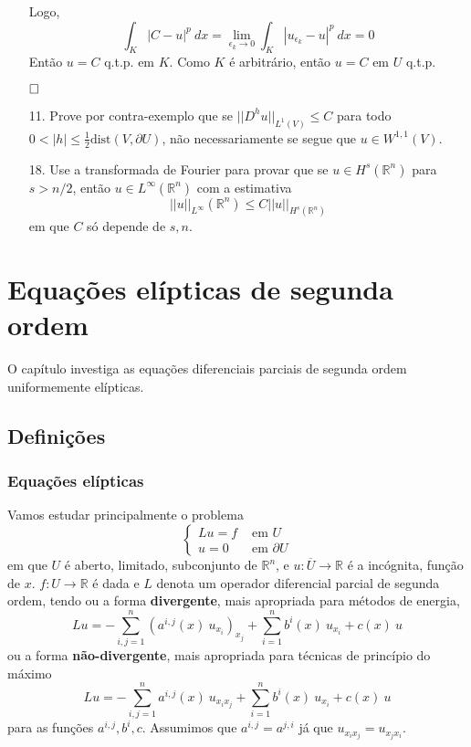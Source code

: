 \documentclass[a4paper, 11pt]{book}
\newcommand{\qed}{$\hfill\square$}
\newcommand{\R}{\mathbb{R}}
\newcommand{\Rn}{{\mathbb{R}^n}}
\newcommand{\rn}{{\mathbb{R}^n}}
\newcommand{\pu}{\partial U}
\begin{document}
\begin{enumerate}
	Logo, \[
	\int_K |C - u|^p \ dx = \lim_{\epsilon_k \rightarrow 0} \int_K | u_{\epsilon_k} - u|^p \ dx = 0	
	\]
	Então $u = C$ q.t.p. em $K$. Como $K$ é arbitrário, então $u=C$ em $U$ q.t.p.
	
	\qed


	\item[11.] Prove por contra-exemplo que se $||D^hu||_{L^1(V)} \leq C$ para todo $0<|h|\leq \frac{1}{2}\text{dist}(V,\pu)$, não necessariamente se segue que $u \in W^{1,1}(V)$.



	\item[18.] Use a transformada de Fourier para provar que se $u \in H^s(\Rn)$ para $s> n/2$, então $u \in L^{\infty}(\Rn)$ com a estimativa \[ ||u||_{L^\infty}(\Rn) \leq C ||u||_{H^s(\Rn)} \] em que $C$ só depende de $s,n$.
\end{enumerate}














\chapter{Equações elípticas de segunda ordem}

O capítulo investiga as equações diferenciais parciais de segunda ordem uniformemente elípticas.

\section{Definições}

\subsection{Equações elípticas}

Vamos estudar principalmente o problema \begin{equation}\label{prob:eliptico}
	\begin{cases}
		Lu=f &\text{ em } U \\
		u =0 &\text{ em } \pu
	\end{cases}
\end{equation}
em que $U$ é aberto, limitado, subconjunto de $\rn$, e $u:\overline{U}\rightarrow\R$ é a incógnita, função de $x$. $f:U\rightarrow \R$ é dada e $L$ denota um operador diferencial parcial de segunda ordem, tendo ou a forma \textbf{divergente}, mais apropriada para métodos de energia,\[
Lu = - \sum_{i,j=1}^n \left(a^{i,j}(x)\ u_{x_i}\right)_{x_j} + \sum_{i=1}^n b^i (x) \ u_{x_i} + c(x)\ u
\]
ou a forma \textbf{não-divergente}, mais apropriada para técnicas de princípio do máximo\[
Lu = - \sum_{i,j=1}^n a^{i,j}(x)\ u_{x_ix_j} + \sum_{i=1}^n b^i (x) \ u_{x_i} + c(x)\ u
\]
para as funções $a^{i,j}, b^i, c$. Assumimos que $a^{i,j}=a^{j,i}$ já que $u_{x_ix_j}=u_{x_jx_i}$.
\end{document}

